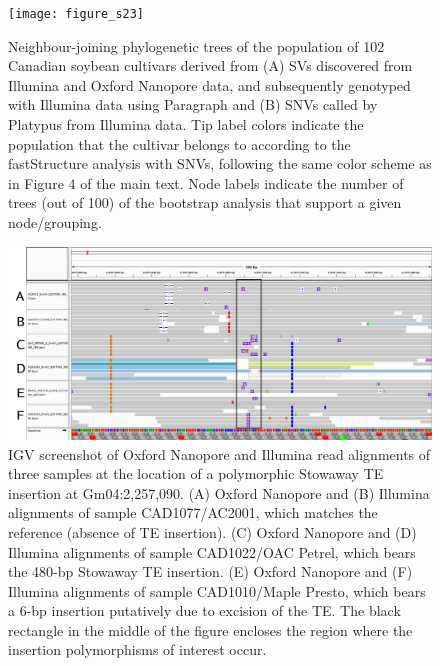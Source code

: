 \documentclass[12pt]{article}
\newenvironment{lsfigure}
	{\begin{landscape} \begin{figure} \centering}
	{\end{figure} \end{landscape}}
\begin{document}
\clearpage%

\begin{lsfigure}
	\texttt{[image: figure\_s23]}

	\caption[Neighbour-joining phylogenetic trees of the population of 102 Canadian soybean cultivars]{
		Neighbour-joining phylogenetic trees of the population of 102 Canadian soybean cultivars derived from (A) SVs discovered from Illumina and Oxford Nanopore data, and subsequently genotyped with Illumina data using Paragraph and (B) SNVs called by Platypus from Illumina data.
		Tip label colors indicate the population that the cultivar belongs to according to the fastStructure analysis with SNVs, following the same color scheme as in Figure 4 of the main text.
		Node labels indicate the number of trees (out of 100) of the bootstrap analysis that support a given node/grouping.
	}

	\label{fig_s23}
\end{lsfigure}

\clearpage%

\begin{lsfigure}
	\includegraphics[width = 9.5in]{Gm04_2257090_annotated}

	\caption[IGV screenshot of Oxford Nanopore and Illumina read alignments of three samples at the location of a polymorphic Stowaway TE insertion]{
		IGV screenshot of Oxford Nanopore and Illumina read alignments of three samples at the location of a polymorphic Stowaway TE insertion at Gm04:2,257,090.
		(A) Oxford Nanopore and (B) Illumina alignments of sample CAD1077/AC2001, which matches the reference (absence of TE insertion).
		(C) Oxford Nanopore and (D) Illumina alignments of sample CAD1022/OAC Petrel, which bears the 480-bp Stowaway TE insertion.
		(E) Oxford Nanopore and (F) Illumina alignments of sample CAD1010/Maple Presto, which bears a 6-bp insertion putatively due to excision of the TE.
		The black rectangle in the middle of the figure encloses the region where the insertion polymorphisms of interest occur.
	}

	\label{fig_s24}

\end{lsfigure}
\end{document}
